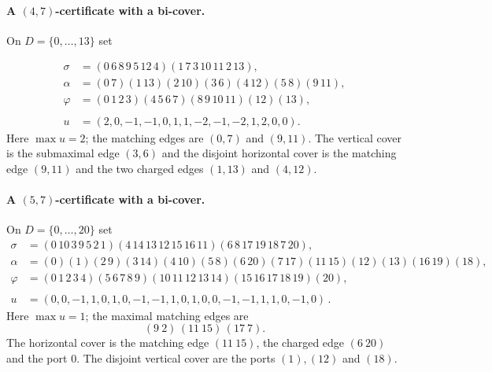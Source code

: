 \documentclass[11pt]{article}
\theoremstyle{remark}
\begin{document}
\paragraph{A $(4,7)$-certificate with a bi-cover.} On $D=\{0,\dots,13\}$ set

\begin{equation}
\begin{aligned}
\sigma&=(0\,6\,8\,9\,5\,12\,4)(1\,7\,3\,10\,11\,2\,13),\\[2pt]
\alpha&=(0\,7)(1\,13)(2\,10)(3\,6)(4\,12)(5\,8)(9\,11),\\[2pt]
\varphi&=(0\,1\,2\,3)(4\,5\,6\,7)(8\,9\,10\,11)(12)(13),\\ \\[2pt]
u&=(2,0,-1,-1,0,1,1,-2,-1,-2,1,2, 0,0).
\end{aligned}
\label{eq:C47}
\end{equation}
Here $\max u=2$; the matching edges are $(0,7)$ and $(9,11)$. The vertical cover is the submaximal edge $(3,6)$ and the disjoint horizontal cover is the matching edge $(9,11)$ and the two charged edges $(1,13)$ and $(4,12)$.


\paragraph{A $(5,7)$-certificate with a bi-cover.} On $D=\{0,\dots,20\}$ set
\begin{equation}
\begin{aligned}
\sigma&=(0\,10\,3\,9\,5\,2\,1)(4\,14\,13\,12\,15\,16\,11)(6\,8\,17\,19\,18\,7\,20),\\[2pt]
\alpha&=(0)(1)(2\,9)(3\,14)(4\,10)(5\,8)(6\,20)(7\,17)(11\,15)(12)(13)(16\,19)(18),\\[2pt]
\varphi&=(0\,1\,2\,3\,4)(5\,6\,7\,8\,9)(10\,11\,12\,13\,14)(15\,16\,17\,18\,19)(20),\\ \\[2pt]
u&=(0,0,-1,1,0,1,0,-1,-1,1,0,1,0,0,-1,-1,1,1,0,-1,0) \, .
\end{aligned}
\label{eq:C57}
\end{equation}
Here $\max u=1$; the maximal matching edges are 
\[(9\ 2)\, (11\ 15) \,(17\  7).\]
The horizontal cover is the matching edge $(11\ 15)$, the charged edge $(6\ 20)$ and the port $0$. The disjoint vertical cover are the ports $(1), (12)$ and $(18)$. 
\end{document}
